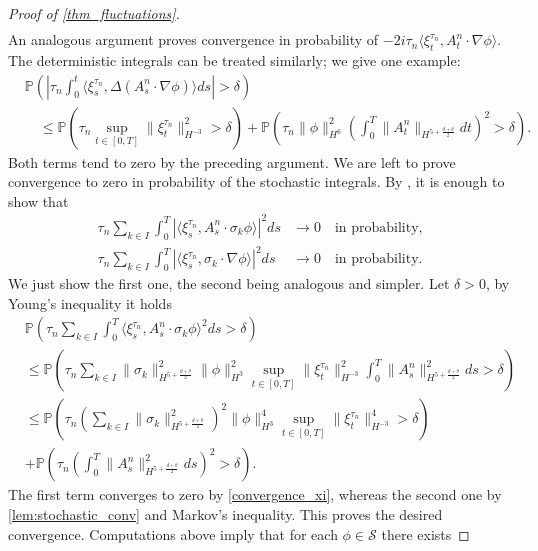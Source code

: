 \documentclass[a4paper,10pt]{amsart}
\theoremstyle{remark}
\numberwithin{equation}{section}
\begin{document}
\begin{proof}[Proof of \cref{thm_fluctuations}]
\begin{align*}
\end{align*}
An analogous argument proves convergence in probability of
$-2i\tau_n\langle \xi^{\tau_n}_t,A^{n}_t\cdot\nabla\phi\rangle$.
The deterministic integrals can be treated similarly; we give one example:
\begin{align*}
    &\mathbb{P}\left(
    \left\lvert\tau_n\int_0^t
    \langle\xi^{\tau_n}_s,\Delta(A^{n}_s\cdot\nabla\phi)\rangle ds
    \right\rvert>\delta\right)\\
    &\quad\leq\mathbb{P}\left(
    \tau_n\sup_{t\in[0,T]}\|\xi^{\tau_n}_t\|_{H^{-3}}^2>\delta
    \right)+\mathbb{P}\left(
    \tau_n\|\phi\|^2_{H^6}
    \left(\int_0^T
    \|A^{n}_t\|_{H^{5+\frac{d+\theta}{2}}}dt\right)^2>\delta
    \right).
\end{align*}
Both terms tend to zero by the preceding argument. We are left to prove
convergence to zero in probability of the stochastic integrals. By
\cite[Lemma 4.3]{bagnara2025no}, it is enough to show that
\begin{align*}
    \tau_n\sum_{k\in I }\int_0^T
    \left|\langle\xi^{\tau_n}_s,
    A^n_s\cdot \sigma_k\phi\rangle\right|^2 ds
    &\rightarrow 0\quad\mbox{in probability,} \\
    \tau_n\sum_{k\in I }\int_0^T
    \left|\langle\xi^{\tau_n}_s,
    \sigma_k\cdot\nabla\phi\rangle\right|^2 ds
    &\rightarrow 0\quad\mbox{in probability.} 
\end{align*}
We just show the first one, the second being analogous and simpler.
Let $\delta>0$, by Young's inequality it holds
\begin{align*}
    &\mathbb{P}\left(\tau_n\sum_{k\in I }\int_0^T \langle\xi^{\tau_n}_s, A^n_s\cdot \sigma_k\phi\rangle^2 ds>\delta\right)\\ &\leq \mathbb{P}\left(\tau_n\sum_{k\in I }\|\sigma_k\|_{H^{5+\frac{d+\theta}{2}}}^2\|\phi\|_{H^3}^2\sup_{t\in [0,T]}\|\xi^{\tau_n}_t\|_{H^{-3}}^2\int_0^T \|A^n_s\|_{H^{5+\frac{d+\theta}{2}}}^2ds>\delta\right)\\ & \leq \mathbb{P}\left(\tau_n\left(\sum_{k\in I }\|\sigma_k\|_{H^{5+\frac{d+\theta}{2}}}^2\right)^2\|\phi\|_{H^3}^4\sup_{t\in [0,T]}\|\xi^{\tau_n}_t\|_{H^{-3}}^4>\delta\right)\\ &  +
    \mathbb{P}\left(\tau_n\left(\int_0^T \|A^n_s\|_{H^{5+\frac{d+\theta}{2}}}^2ds\right)^2>\delta\right).
\end{align*}
The first term converges to zero by \eqref{convergence_xi}, whereas the second one by \cref{lem:stochastic_conv} and Markov's inequality.  This proves the desired convergence. Computations above imply that for each $\phi \in \mathscr{S}$ there exists

\end{proof}
\end{document}
